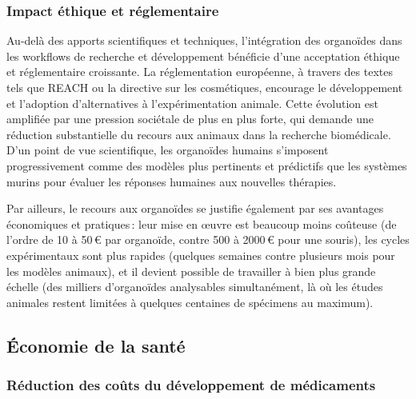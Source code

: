 \subsubsection{Impact éthique et réglementaire}

Au-delà des apports scientifiques et techniques, l’intégration des organoïdes dans les workflows de recherche et développement bénéficie d’une acceptation éthique et réglementaire croissante. La réglementation européenne, à travers des textes tels que REACH ou la directive sur les cosmétiques, encourage le développement et l’adoption d’alternatives à l’expérimentation animale. Cette évolution est amplifiée par une pression sociétale de plus en plus forte, qui demande une réduction substantielle du recours aux animaux dans la recherche biomédicale. D’un point de vue scientifique, les organoïdes humains s’imposent progressivement comme des modèles plus pertinents et prédictifs que les systèmes murins pour évaluer les réponses humaines aux nouvelles thérapies.

Par ailleurs, le recours aux organoïdes se justifie également par ses avantages économiques et pratiques : leur mise en œuvre est beaucoup moins coûteuse (de l’ordre de 10 à 50 € par organoïde, contre 500 à 2000 € pour une souris), les cycles expérimentaux sont plus rapides (quelques semaines contre plusieurs mois pour les modèles animaux), et il devient possible de travailler à bien plus grande échelle (des milliers d’organoïdes analysables simultanément, là où les études animales restent limitées à quelques centaines de spécimens au maximum).

\subsection{Économie de la santé}

\subsubsection{Réduction des coûts du développement de médicaments}

